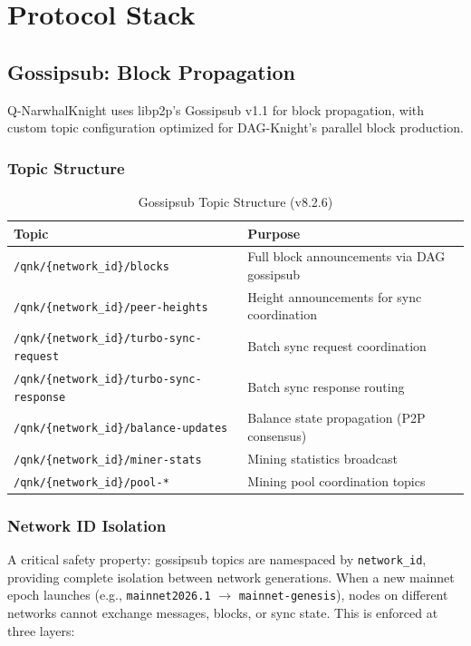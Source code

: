 \documentclass[11pt,a4paper]{article}
\begin{document}
\section{Protocol Stack}

\subsection{Gossipsub: Block Propagation}

Q-NarwhalKnight uses libp2p's Gossipsub v1.1 for block propagation, with custom topic configuration optimized for DAG-Knight's parallel block production.

\subsubsection{Topic Structure}

\begin{table}[H]
\centering
\begin{tabular}{ll}
\toprule
\textbf{Topic} & \textbf{Purpose} \\
\midrule
\texttt{/qnk/\{network\_id\}/blocks} & Full block announcements via DAG gossipsub \\
\texttt{/qnk/\{network\_id\}/peer-heights} & Height announcements for sync coordination \\
\texttt{/qnk/\{network\_id\}/turbo-sync-request} & Batch sync request coordination \\
\texttt{/qnk/\{network\_id\}/turbo-sync-response} & Batch sync response routing \\
\texttt{/qnk/\{network\_id\}/balance-updates} & Balance state propagation (P2P consensus) \\
\texttt{/qnk/\{network\_id\}/miner-stats} & Mining statistics broadcast \\
\texttt{/qnk/\{network\_id\}/pool-*} & Mining pool coordination topics \\
\bottomrule
\end{tabular}
\caption{Gossipsub Topic Structure (v8.2.6)}
\end{table}

\subsubsection{Network ID Isolation}

A critical safety property: gossipsub topics are namespaced by \texttt{network\_id}, providing complete isolation between network generations. When a new mainnet epoch launches (e.g., \texttt{mainnet2026.1} $\rightarrow$ \texttt{mainnet-genesis}), nodes on different networks cannot exchange messages, blocks, or sync state. This is enforced at three layers:
\end{document}
